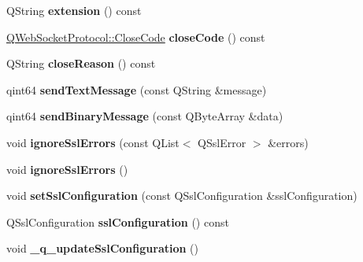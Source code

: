 \begin{DoxyCompactItemize}
\mbox{\label{class_q_web_socket_private_a517aa347cef57ca48aea6552729dce09}} 
Q\+String {\bfseries extension} () const
\item 
\mbox{\label{class_q_web_socket_private_a2e9728b921c46622f758e53d5da90f92}} 
\mbox{\hyperlink{namespace_q_web_socket_protocol_a9f236676f594451d8d723f260b71028c}{Q\+Web\+Socket\+Protocol\+::\+Close\+Code}} {\bfseries close\+Code} () const
\item 
\mbox{\label{class_q_web_socket_private_a44af1931d0a05e332805535f29fe0acc}} 
Q\+String {\bfseries close\+Reason} () const
\item 
\mbox{\label{class_q_web_socket_private_ad50b006d65cdc8798bec2212ad012bb7}} 
qint64 {\bfseries send\+Text\+Message} (const Q\+String \&message)
\item 
\mbox{\label{class_q_web_socket_private_abd9aec2c6e318bdb0157c31227cada08}} 
qint64 {\bfseries send\+Binary\+Message} (const Q\+Byte\+Array \&data)
\item 
\mbox{\label{class_q_web_socket_private_a434e42ec86e51953566890ff7f23f70a}} 
void {\bfseries ignore\+Ssl\+Errors} (const Q\+List$<$ Q\+Ssl\+Error $>$ \&errors)
\item 
\mbox{\label{class_q_web_socket_private_a2e94b5e16f730d058d8ec805d78145f3}} 
void {\bfseries ignore\+Ssl\+Errors} ()
\item 
\mbox{\label{class_q_web_socket_private_a546e8a623b8f50aadfc349fd5beb5b03}} 
void {\bfseries set\+Ssl\+Configuration} (const Q\+Ssl\+Configuration \&ssl\+Configuration)
\item 
\mbox{\label{class_q_web_socket_private_a7ce14ce75e0b6a4fe39fb8fdc2fe6f0f}} 
Q\+Ssl\+Configuration {\bfseries ssl\+Configuration} () const
\item 
\mbox{\label{class_q_web_socket_private_a675ff9eb040d87d16d545d0740fe744f}} 
void {\bfseries \+\_\+q\+\_\+update\+Ssl\+Configuration} ()

\end{DoxyCompactItemize}
